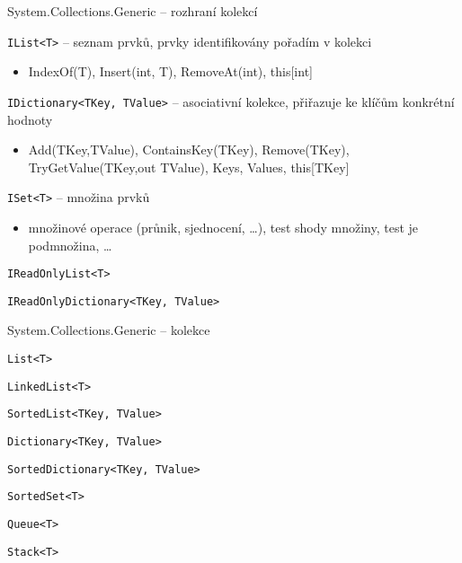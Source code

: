 \begin{frame}[fragile]
\begin{bitemize}{System.Collections.Generic -- rozhraní kolekcí}
\item \lstinline|IList<T>| -- seznam prvků, prvky identifikovány pořadím v kolekci
\begin{itemize}
\item \footnotesize IndexOf(T), Insert(int, T), RemoveAt(int), this[int]
\end{itemize}

\item \lstinline|IDictionary<TKey, TValue>| -- asociativní kolekce, přiřazuje ke klíčům konkrétní hodnoty
\begin{itemize}
\item \footnotesize Add(TKey,TValue), ContainsKey(TKey), Remove(TKey), TryGetValue(TKey,out TValue), Keys, Values, this[TKey]
\end{itemize}

\item \lstinline|ISet<T>| -- množina prvků
\begin{itemize}
\item \footnotesize množinové operace (průnik, sjednocení, \ldots), test shody množiny, test je podmnožina, \ldots
\end{itemize}

\item \lstinline|IReadOnlyList<T>|
\item \lstinline|IReadOnlyDictionary<TKey, TValue>|
\end{bitemize}
\end{frame}




\begin{frame}[fragile]
\begin{bitemize}{System.Collections.Generic -- kolekce}
\item \lstinline|List<T>|
\item \lstinline|LinkedList<T>|
\item \lstinline|SortedList<TKey, TValue>|
\item []
\item \lstinline|Dictionary<TKey, TValue>|
\item \lstinline|SortedDictionary<TKey, TValue>|
\item \lstinline|SortedSet<T>|
\item []
\item \lstinline|Queue<T>|
\item \lstinline|Stack<T>|
\end{bitemize}
\end{frame}











